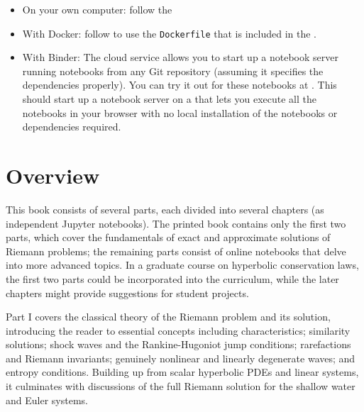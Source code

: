 \documentclass{SIAMbook2016}
\providecommand{\tightlist}{%
      \setlength{\itemsep}{0pt}\setlength{\parskip}{0pt}}
\begin{document}
\begin{itemize}
\tightlist
\item
  On your own computer: follow the
\item
  With Docker: follow
   to use the \texttt{Dockerfile} that is included in the
  .
\item
  With Binder: The cloud service 
  allows you to start up a notebook server running notebooks from any
  Git repository (assuming it specifies the dependencies properly). You
  can try it out for these notebooks at
  . This should start up a notebook server on a
   that
  lets you execute all the notebooks in your browser with no local
  installation of the notebooks or dependencies required.
\end{itemize}

\hypertarget{overview}{%
\section*{Overview}\label{overview}}

This book consists of several parts, each divided into several chapters
(as independent Jupyter notebooks). The printed book contains only the
first two parts, which cover the fundamentals of exact and approximate
solutions of Riemann problems; the remaining parts consist of online
notebooks that delve into more advanced topics. In a graduate course on
hyperbolic conservation laws, the first two parts could be incorporated
into the curriculum, while the later chapters might provide suggestions
for student projects.

Part I covers the classical theory of the Riemann problem and its
solution, introducing the reader to essential concepts including
characteristics; similarity solutions; shock waves and the
Rankine-Hugoniot jump conditions; rarefactions and Riemann invariants;
genuinely nonlinear and linearly degenerate waves; and entropy
conditions. Building up from scalar hyperbolic PDEs and linear systems,
it culminates with discussions of the full Riemann solution for the
shallow water and Euler systems.
\end{document}
